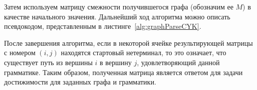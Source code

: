 Затем используем матрицу смежности получившегося графа (обозначим ее $M$) в качестве начального значения.
Дальнейший ход алгоритма можно описать псевдокодом, представленным в листинге~\ref{alg:graphParseCYK}.



После завершения алгоритма, если в некоторой ячейке результирующей матрицы с номером $(i, j)$ находятся стартовый нетерминал, то это означает, что существует путь из вершины $i$ в вершину $j$, удовлетворяющий данной грамматике.
Таким образом, полученная матрица является ответом для задачи достижимости для заданных графа и грамматики.

